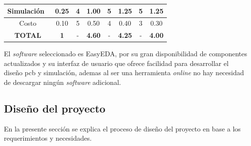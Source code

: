\begin{tabla}[disel]
{\begin{tabular}{|c|c|c|c|c|c|c|c|}
\hline
\rowcolor[rgb]{0.027,0.894,0.675} Simulación~                                                             & 0.25                                                                       & 4               & 1.00                 & 5               & 1.25                 & 5               & 1.25                  \\ 
\hline
Costo                                                                                                     & 0.10                                                                       & 5               & 0.50                 & 4               & 0.40                 & 3               & 0.30                  \\ 
\hline
\textbf{TOTAL}                                                                                            & \textbf{1}                                                                 & -               & \textbf{4.60}        & -               & \textbf{4.25}        & -               & \textbf{4.00}         \\
\hline
\end{tabular}

}

\end{tabla}

El \textit{software} seleccionado es EasyEDA, por su gran disponibilidad de componentes actualizados y su interfaz de usuario que ofrece facilidad para desarrollar el diseño \acrshort{pcb} y simulación, ademas al ser una herramienta \textit{online} no hay necesidad de descargar ningún \textit{software} adicional.

\subsection{Diseño del proyecto}
En la presente sección se explica el proceso de diseño del proyecto en base a los requerimientos y necesidades.

